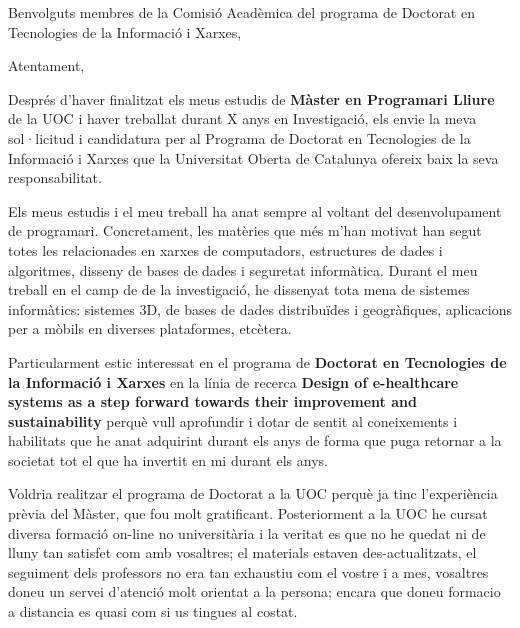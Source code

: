 
%
%


\date{febrer 10, 2017}
\opening{Benvolguts membres de la Comisió Acadèmica del programa de Doctorat en Tecnologies de la Informació i Xarxes,}
\closing{Atentament,}




\makelettertitle

Després d'haver finalitzat els meus estudis de \textbf{Màster en Programari Lliure} de la UOC i haver treballat durant X anys en Investigació, els envie la meva sol·licitud i candidatura per al Programa de Doctorat en Tecnologies de la Informació i Xarxes que la Universitat Oberta de Catalunya ofereix baix la seva responsabilitat.

Els meus estudis i el meu treball ha anat sempre al voltant del desenvolupament de programari. Concretament, les matèries que més m'han motivat han segut totes les relacionades en xarxes de computadors, estructures de dades i algoritmes, disseny de bases de dades i seguretat informàtica. Durant el meu treball en el camp de de la investigació, he dissenyat tota mena de sistemes informàtics: sistemes 3D, de bases de dades distribuïdes i geogràfiques, aplicacions per a mòbils en diverses plataformes, etcètera.

Particularment estic interessat en el programa de \textbf{Doctorat en Tecnologies de la Informació i Xarxes} en la línia de recerca \textbf{Design of e-healthcare systems as a step forward towards their improvement and sustainability} perquè vull aprofundir i dotar de sentit al coneixements i habilitats que he anat adquirint durant els anys de forma que puga retornar a la societat tot el que ha invertit en mi durant els anys.

Voldria realitzar el programa de Doctorat a la UOC perquè ja tinc l'experiència prèvia del Màster, que fou molt gratificant. Posteriorment a la UOC he cursat diversa formació on-line no universitària i la veritat es que no he quedat ni de lluny tan satisfet com amb vosaltres; el materials estaven des-actualitzats, el seguiment dels professors no era tan exhaustiu com el vostre i a mes, vosaltres doneu un servei d'atenció molt orientat a la persona; encara que doneu formacio a distancia es quasi com si us tingues al costat. 


\makeletterclosing

\clearpage